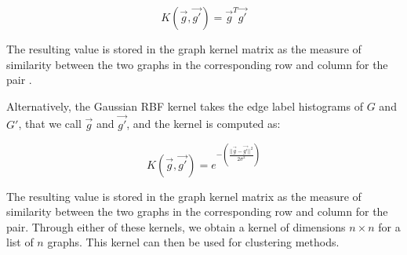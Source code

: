 \begin{equation}
K(\vec{g},\vec{g'}) = \vec{g}^{T}\vec{g'}
\end{equation}

The resulting value is stored in the graph kernel matrix as the measure of similarity between the two graphs in the corresponding row and column for the pair \cite{sugiyama2015halting}.

Alternatively, the Gaussian RBF kernel takes the edge label histograms of $G$ and $G'$, that we call $\vec{g}$ and $\vec{g'}$, and the kernel is computed as:


\begin{equation}
K(\vec{g},\vec{g'}) = e^{- \left( \frac{||\vec{g}- \vec{g'}||^2}{2 \sigma^2} \right) }
\end{equation}

The resulting value is stored in the graph kernel matrix as the measure of similarity between the two graphs in the corresponding row and column for the pair. Through either of these kernels, we obtain a kernel of dimensions $n \times n$ for a list of $n$ graphs. This kernel can then be used for clustering methods.



